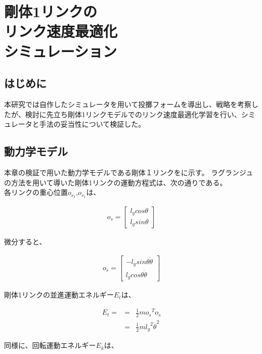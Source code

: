 \chapter[剛体1リンクのリンク速度最適化シミュレーション]{剛体1リンクの\\リンク速度最適化\\シミュレーション}

\section{はじめに}
本研究では自作したシミュレータを用いて投擲フォームを導出し、戦略を考察したが、検討に先立ち剛体1リンクモデルでのリンク速度最適化学習を行い、シミュレータと手法の妥当性について検証した。
\section{動力学モデル}
本章の検証で用いた動力学モデルである剛体１リンクをに示す。
ラグランジュの方法を用いて導いた剛体1リンクの運動方程式は、次の通りである。\\
各リンクの重心位置$o_{s_{1}}$,$o_{s_{1}}$は、

\begin{eqnarray}
  o_{s} = 
              \begin{bmatrix}
              l_{g}cos\theta\\
              l_{g}sin\theta
              \end{bmatrix}
\end{eqnarray}

微分すると、

\begin{eqnarray}
  o_{\dot{s}} = 
              \begin{bmatrix}
              -l_{g}sin\theta\dot{\theta}\\
              l_{g}cos\theta\dot{\theta}
              \end{bmatrix}
\end{eqnarray}

剛体1リンクの並進運動エネルギー$E_{t}$は、

\begin{eqnarray}
  E_{t} =
  &=&\frac{1}{2}mo_{\dot{s}}{}^T\!o_{\dot{s}} \nonumber \\
  &=&\frac{1}{2}m{l_{g}}^2{\dot{\theta}}^2
\end{eqnarray}

同様に、回転運動エネルギー$E_{k}$は、

